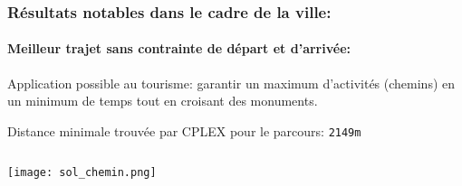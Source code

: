 \documentclass[10pt]{beamer}
\begin{document}
\begin{frame}
\frametitle{Résultats notables dans le cadre de la ville:}
\framesubtitle{Meilleur trajet sans contrainte de départ et d'arrivée:}


Application possible au tourisme: garantir un maximum d'activités (chemins) en un minimum de temps tout en croisant des monuments.

\vfill
Distance minimale trouvée par CPLEX pour le parcours: \texttt{2149m}

\begin{columns}[T]
\begin{column}{0.30\textwidth}
\begin{center}
\texttt{[image: sol\_chemin.png]}
\end{center}
\end{column}
\end{columns}
\end{frame}
\end{document}
